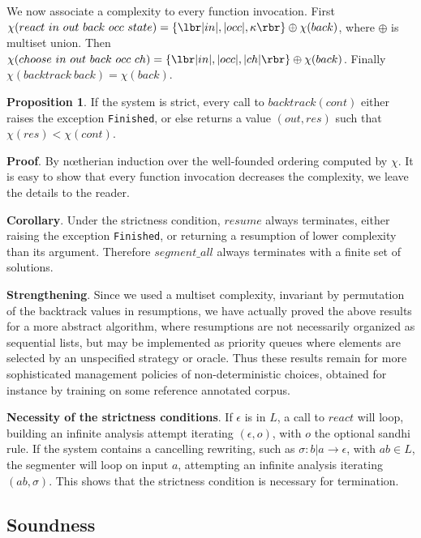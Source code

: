 We now associate a complexity to every function invocation.
First\\
$\chi(react ~in ~out ~back ~occ ~state)=
\{\lbr\vert in\vert,\vert occ\vert,\kappa\rbr\}\oplus \chi(back)$, 
where $\oplus$ is multiset union.
Then $\chi(choose ~in ~out ~back ~occ ~ch)=
\{\lbr\vert in\vert,\vert occ\vert,\vert ch \vert\rbr\}\oplus \chi(back)$.
Finally $\chi(backtrack ~back)=\chi(back)$. 

\noindent
{\bf Proposition 1}. If the system is strict, every call to
$backtrack(cont)$ either raises the exception \verb:Finished:,
or else returns a value $(out,res)$ such that $\chi(res)<\chi(cont)$.

\noindent
{\bf Proof}. By n{\oe}therian induction over the well-founded
ordering computed by $\chi$. It is easy to show that every function invocation 
decreases the complexity, we leave the details to the reader.

\noindent
{\bf Corollary}. Under the strictness condition,
$resume$ always terminates, either raising the exception \verb:Finished:,
or returning a resumption of lower complexity than its argument. 
Therefore $segment\_all$ always terminates with a finite set of solutions.

\noindent
{\bf Strengthening}. Since we used a multiset complexity, invariant by
permutation of the backtrack values in resumptions, we have actually proved
the above results for a more abstract algorithm, where resumptions are not
necessarily organized as sequential lists, but may be implemented as priority
queues where elements are selected by an unspecified strategy or oracle. 
Thus these results remain for more sophisticated management policies of
non-deterministic choices, obtained for instance by training on
some reference annotated corpus.

\noindent
{\bf Necessity of the strictness conditions}. If $\epsilon$ is in $L$, a
call to $react$ will loop, building an infinite analysis attempt
iterating $(\epsilon,o)$, with $o$ the optional sandhi rule.
If the system contains a cancelling rewriting, such as 
$\sigma:b|a\rightarrow \epsilon$, with $ab\in L$, the segmenter will loop on
input $a$, attempting an infinite analysis iterating
$(ab,\sigma)$. This shows that the strictness condition is necessary for
termination. 

\subsection{Soundness}

